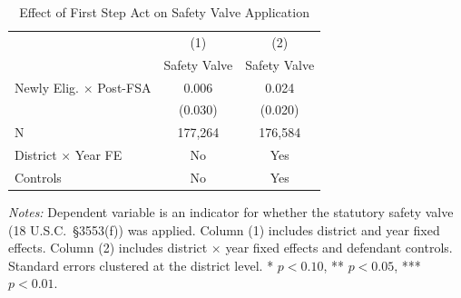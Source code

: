 \begin{table}[H]
\centering
\caption{Effect of First Step Act on Safety Valve Application}
\label{tab:sv}
\begin{threeparttable}
\begin{tabular}{lcc}
\toprule
 & (1) & (2) \\
 & Safety Valve & Safety Valve \\
\midrule
Newly Elig. $\times$ Post-FSA & 0.006 & 0.024 \\
 & (0.030) & (0.020) \\
\midrule
N & 177,264 & 176,584 \\
District $\times$ Year FE & No & Yes \\
Controls & No & Yes \\
\bottomrule
\end{tabular}
\begin{tablenotes}[flushleft]
\small
\item \textit{Notes:} Dependent variable is an indicator for whether the statutory safety valve (18 U.S.C.\ \S3553(f)) was applied. Column (1) includes district and year fixed effects. Column (2) includes district $\times$ year fixed effects and defendant controls. Standard errors clustered at the district level. * $p<0.10$, ** $p<0.05$, *** $p<0.01$.
\end{tablenotes}
\end{threeparttable}
\end{table}
